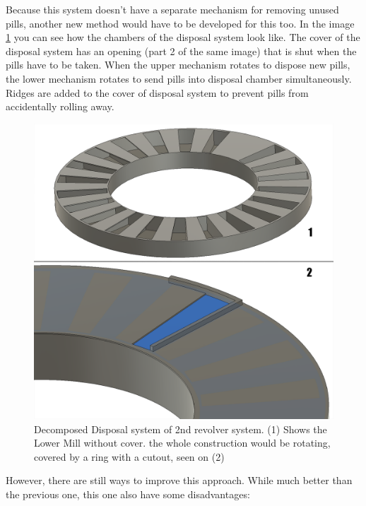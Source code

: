 Because this system doesn't have a separate mechanism for removing unused pills, another new method would have to be developed for this too. In the image \ref{fig:screenshot2} you can see how the chambers of the disposal system look like. The cover of the disposal system has an opening (part 2 of the same image) that is shut when the pills have to be taken. When the upper mechanism rotates to dispose new pills, the lower mechanism rotates to send pills into disposal chamber simultaneously. Ridges are added to the cover of disposal system to prevent pills from accidentally rolling away.

\begin{figure}[h]
	\centering
	\includegraphics[width=0.6\linewidth]{Figures/PSPD2-Chambers}
	\caption[Disposal system of 2nd revolver system]{Decomposed Disposal system of 2nd revolver system. (1) Shows the Lower Mill without cover. the whole construction would be rotating, covered by a ring with a cutout, seen on (2)}
	\label{fig:screenshot2}
\end{figure}
\newpage
However, there are still ways to improve this approach. While much better than the previous one, this one also have some disadvantages:
